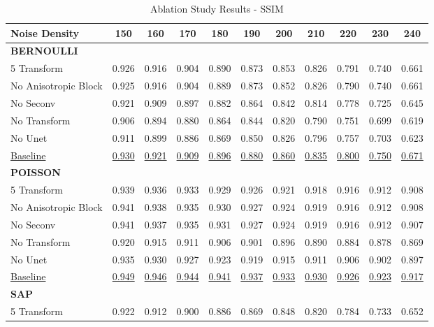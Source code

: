 \begin{table}[!hbt]
    \centering
    \caption{Ablation Study Results - SSIM}
    \begin{tabular}{lcccccccccc}
    \toprule
    Noise Density & 150 & 160 & 170 & 180 & 190 & 200 & 210 & 220 & 230 & 240 \\
    \midrule
    \textbf{BERNOULLI} \\
    5 Transform & 0.926 & 0.916 & 0.904 & 0.890 & 0.873 & 0.853 & 0.826 & 0.791 & 0.740 & 0.661 \\
    No Anisotropic Block & 0.925 & 0.916 & 0.904 & 0.889 & 0.873 & 0.852 & 0.826 & 0.790 & 0.740 & 0.661 \\
    No Seconv & 0.921 & 0.909 & 0.897 & 0.882 & 0.864 & 0.842 & 0.814 & 0.778 & 0.725 & 0.645 \\
    No Transform & 0.906 & 0.894 & 0.880 & 0.864 & 0.844 & 0.820 & 0.790 & 0.751 & 0.699 & 0.619 \\
    No Unet & 0.911 & 0.899 & 0.886 & 0.869 & 0.850 & 0.826 & 0.796 & 0.757 & 0.703 & 0.623 \\
    \underline{Baseline} & \underline{0.930} & \underline{0.921} & \underline{0.909} & \underline{0.896} & \underline{0.880} & \underline{0.860} & \underline{0.835} & \underline{0.800} & \underline{0.750} & \underline{0.671} \\
    \midrule
    \textbf{POISSON} \\
    5 Transform & 0.939 & 0.936 & 0.933 & 0.929 & 0.926 & 0.921 & 0.918 & 0.916 & 0.912 & 0.908 \\
    No Anisotropic Block & 0.941 & 0.938 & 0.935 & 0.930 & 0.927 & 0.924 & 0.919 & 0.916 & 0.912 & 0.908 \\
    No Seconv & 0.941 & 0.937 & 0.935 & 0.931 & 0.927 & 0.924 & 0.919 & 0.916 & 0.912 & 0.907 \\
    No Transform & 0.920 & 0.915 & 0.911 & 0.906 & 0.901 & 0.896 & 0.890 & 0.884 & 0.878 & 0.869 \\
    No Unet & 0.935 & 0.930 & 0.927 & 0.923 & 0.919 & 0.915 & 0.911 & 0.906 & 0.902 & 0.897 \\
    \underline{Baseline} & \underline{0.949} & \underline{0.946} & \underline{0.944} & \underline{0.941} & \underline{0.937} & \underline{0.933} & \underline{0.930} & \underline{0.926} & \underline{0.923} & \underline{0.917} \\
    \midrule
    \textbf{SAP} \\
    5 Transform & 0.922 & 0.912 & 0.900 & 0.886 & 0.869 & 0.848 & 0.820 & 0.784 & 0.733 & 0.652 \\

\end{tabular}
\end{table}

